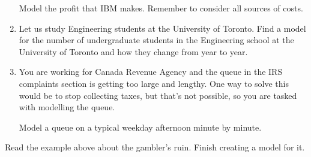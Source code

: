\begin{exercises}
\begin{problist}
\begin{enumerate}
			Model the profit that IBM makes. Remember to consider all sources of costs.
	
		\item Let us study Engineering students at the University of Toronto. Find a model for the number of undergraduate students in the Engineering school at the University of Toronto and how they change from year to year. 

		\item You are working for Canada Revenue Agency and the queue in the IRS complaints section is getting too large and lengthy. One way to solve this would be to stop collecting taxes, but that's not possible, so you are tasked with modelling the queue. 

			Model a queue on a typical weekday afternoon minute by minute. 



	\end{enumerate}

	
	
	\prob Read the example above about the gambler's ruin. Finish creating a model for it.
	

	
	\end{problist}
\end{exercises}
